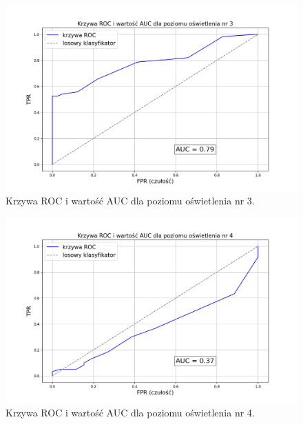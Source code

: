 \begin{figure}[H]
    \centering
    \includegraphics[width=\linewidth]{r_test_dokładności/AUC_charts/3.png}
    \caption{Krzywa ROC i wartość AUC dla poziomu oświetlenia nr 3.}
    \label{fig:ROC-3}
\end{figure}

\begin{figure}[H]
    \centering
    \includegraphics[width=\linewidth]{r_test_dokładności/AUC_charts/4.png}
    \caption{Krzywa ROC i wartość AUC dla poziomu oświetlenia nr 4.}
    \label{fig:ROC-4}
\end{figure}

